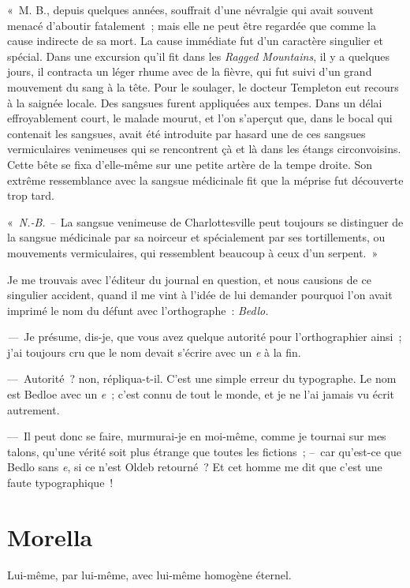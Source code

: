 \documentclass[french,twoside]{book} %
\begin{document}
« M. B., depuis quelques années, souffrait d’une névralgie qui avait souvent menacé d’aboutir fatalement ; mais elle ne peut être regardée que comme la cause indirecte de sa mort. La cause immédiate fut d’un caractère singulier et spécial. Dans une excursion qu’il fit dans les \emph{Ragged Mountains}, il y a quelques jours, il contracta un léger rhume avec de la fièvre, qui fut suivi d’un grand mouvement du sang à la tête. Pour le soulager, le docteur Templeton eut recours à la saignée locale. Des sangsues furent appliquées aux tempes. Dans un délai effroyablement court, le malade mourut, et l’on s’aperçut que, dans le bocal qui contenait les sangsues, avait été introduite par hasard une de ces sangsues vermiculaires venimeuses qui se rencontrent çà et là dans les étangs circonvoisins. Cette bête se fixa d’elle-même sur une petite artère de la tempe droite. Son extrême ressemblance avec la sangsue médicinale fit que la méprise fut découverte trop tard.\par
« \emph{N.-B. –} La sangsue venimeuse de Charlottesville peut toujours se distinguer de la sangsue médicinale par sa noirceur et spécialement par ses tortillements, ou mouvements vermiculaires, qui ressemblent beaucoup à ceux d’un serpent. »\par
Je me trouvais avec l’éditeur du journal en question, et nous causions de ce singulier accident, quand il me vint à l’idée de lui demander pourquoi l’on avait imprimé le nom du défunt avec l’orthographe : \emph{Bedlo.}\par
\emph{—} Je présume, dis-je, que vous avez quelque autorité pour l’orthographier ainsi ; j’ai toujours cru que le nom devait s’écrire avec un \emph{e} à la fin.\par
— Autorité ? non, répliqua-t-il. C’est une simple erreur du typographe. Le nom est Bedloe avec un \emph{e} ; c’est connu de tout le monde, et je ne l’ai jamais vu écrit autrement.\par
— Il peut donc se faire, murmurai-je en moi-même, comme je tournai sur mes talons, qu’une vérité soit plus étrange que toutes les fictions ; – car qu’est-ce que Bedlo sans \emph{e}, si ce n’est Oldeb retourné ? Et cet homme me dit que c’est une faute typographique !
\section[{Morella}]{Morella}\renewcommand{\leftmark}{Morella}

\noindent Lui-même, par lui-même, avec lui-même homogène éternel.\par
\end{document}
